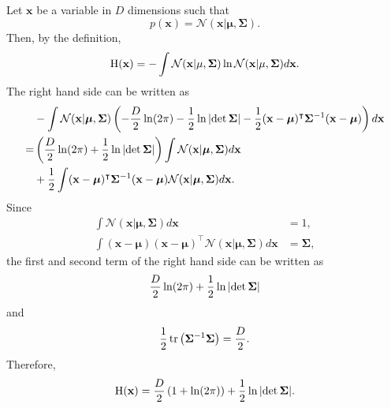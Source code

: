 \subsection{}
\label{2.15}
Let $\mathbf{x}$ be a variable in $D$ dimensions such that
%
\begin{equation}
p(\mathbf{x}) 
= 
\mathcal{N} (\mathbf{x} | \bm{\mu}, \bm{\Sigma}).
\end{equation}
%
Then, by the definition,
%
\begin{equation}
{\rm H}(\mathbf{x}) 
= 
- 
\int
\mathcal{N} (\mathbf{x} | \mathbf{\mu}, \mathbf{\Sigma}) 
\ln \mathcal{N} (\mathbf{x} | \mathbf{\mu}, \mathbf{\Sigma}) 
d\mathbf{x}.
\end{equation}
%
The right hand side can be written as
%
\begin{equation}
\begin{aligned}
&
- 
\int 
\mathcal{N} (\mathbf{x} | \bm{\mu}, \bm{\Sigma}) 
\left( 
	- 
	\frac{D}{2} 
	\ln (2 \pi) 
	- 
	\frac{1}{2} 
	\ln \abs{\det \bm{\Sigma}} 
	- 
	\frac{1}{2} 
	(\mathbf{x} - \bm{\mu}) ^ \intercal 
	\bm{\Sigma} ^ {- 1} 
	(\mathbf{x} - \bm{\mu}) 
\right) 
d\mathbf{x} 
\\
=& 
\left( 
	\frac{D}{2} 
	\ln (2 \pi) 
	+ 
	\frac{1}{2} 
	\ln \abs{\det \bm{\Sigma}} 
\right) 
\int 
\mathcal{N} (\mathbf{x} | \bm{\mu}, \bm{\Sigma}) 
d\mathbf{x} 
\\
&+ 
\frac{1}{2} 
\int 
(\mathbf{x} - \bm{\mu}) ^ \intercal 
\bm{\Sigma} ^ {- 1} 
(\mathbf{x} - \bm{\mu}) 
\mathcal{N} (\mathbf{x} | \bm{\mu}, \bm{\Sigma}) 
d\mathbf{x}.
\end{aligned}
\end{equation}
%
Since
%
\begin{equation}
\begin{aligned}
\int
\mathcal{N} (\mathbf{x} | \bm{\mu}, \bm{\Sigma}) 
d\mathbf{x} 
&= 
1, 
\\
\int 
(\mathbf{x} - \bm{\mu}) 
(\mathbf{x} - \bm{\mu}) ^ \intercal 
\mathcal{N} (\mathbf{x} | \bm{\mu}, \bm{\Sigma}) 
d\mathbf{x} 
&= 
\bm{\Sigma},
\end{aligned}
\end{equation}
%
the first and second term of the right hand side can be written as
%
\begin{equation}
\frac{D}{2} 
\ln (2 \pi) 
+ 
\frac{1}{2} 
\ln \abs{\det \bm{\Sigma}}
\end{equation}
%
and
%
\begin{equation}
\frac{1}{2} 
\tr 
\left( 
	\bm{\Sigma} ^ {- 1} 
	\bm{\Sigma} 
\right) 
= 
\frac{D}{2}.
\end{equation}
%
Therefore,
%
\begin{equation}
{\rm H}(\mathbf{x}) 
= 
\frac{D}{2} 
\left( 
	1 
	+ 
	\ln (2 \pi) 
\right) 
+ 
\frac{1}{2} 
\ln \abs{\det \bm{\Sigma}}.
\end{equation}
%


